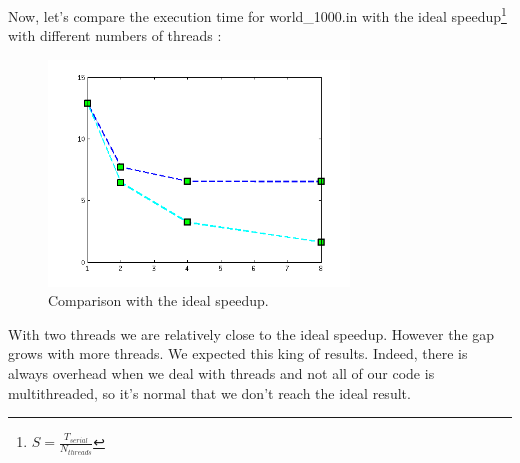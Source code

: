 \documentclass[a4paper,10pt]{article}
\begin{document}
Now, let's compare the execution time for  world\_1000.in with the ideal speedup\footnote{$S = \frac{T_{serial}}{N_{threads}}$}
with different numbers of threads :

\begin{figure}[!ht]
  \centering
  \includegraphics[width=8cm]{speedup.png}
  \caption{Comparison with the ideal speedup.}
\end{figure} 

With two threads we are relatively close to the ideal speedup. However the gap grows with more threads. We expected this king of results.
Indeed, there is always overhead when we deal with threads and not all of our code is multithreaded, so it's normal that we don't reach
the ideal result.
\end{document}

